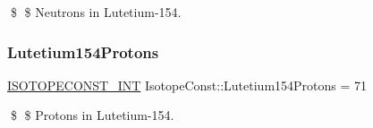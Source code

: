 \$ \$ Neutrons in Lutetium-\/154. \mbox{\label{group___isotope_const-_lutetium-_lu154_gac3351606829e3d8861de085b2d78860b}} 
\subsubsection{\texorpdfstring{Lutetium154\+Protons}{Lutetium154Protons}}
{\footnotesize\ttfamily \mbox{\hyperlink{group___isotope_const-_macros_ga5f18360b3e99483a35c32d789e62621c}{I\+S\+O\+T\+O\+P\+E\+C\+O\+N\+S\+T\+\_\+\+I\+NT}} Isotope\+Const\+::\+Lutetium154\+Protons = 71}

\$ \$ Protons in Lutetium-\/154. 